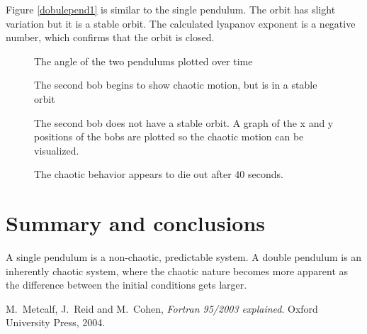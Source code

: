 \documentclass[12pt]{article}
\begin{document}
Figure \ref{dobulepend1} is similar to the single pendulum. The orbit has slight variation but it is a stable orbit. The calculated lyapanov exponent is a negative number, which confirms that the orbit is closed. 

\begin {figure}[!htb]
	\resizebox{\columnwidth}{!}{}
	\caption{The angle of the two pendulums plotted over time}
	\label{dobulepend1_1}
\end {figure}

\begin {figure}[!htb]
	\resizebox{\columnwidth}{!}{}
	\resizebox{\columnwidth}{!}{}
	\caption{The second bob begins to show chaotic motion, but is in a stable orbit }
	\label{dobulepend2}
\end {figure}

\begin {figure}[!htb]
	
	
	\caption{The second bob does not have a stable orbit. A graph of the x and y positions of the bobs are plotted so the chaotic motion can be visualized. }
	\label{dobulepend3}
\end {figure}

\begin {figure}[!htb]
	\resizebox{\columnwidth}{!}{}
	\caption{The chaotic behavior appears to die out after 40 seconds. }
	\label{dobulepend2_1}
\end {figure}



\section{Summary and conclusions}

A single pendulum is a non-chaotic, predictable system. A double pendulum is an inherently chaotic system, where the chaotic nature becomes more apparent as the difference between the initial conditions gets larger. 

\begin{thebibliography}{}


 M.\ Metcalf, J.\ Reid and M.\ Cohen, {\it Fortran 95/2003 explained}. Oxford University Press, 2004.
 

\end{thebibliography}
\end{document}
